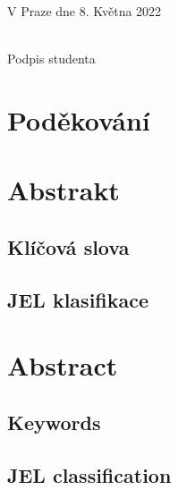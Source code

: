 \vspace{2cm}
\noindent
V Praze dne 8. Května 2022
\hfill%
\begin{minipage}[t]{.5\textwidth}%
\begin{center}
\dotfill\\
Podpis studenta
\end{center}
\end{minipage}
\vspace{1cm}

\openright
\vspace*{\fill}
\section*{Poděkování}
\noindent
\Podekovani
\vspace{1cm}


\openright
\section*{Abstrakt}
\noindent
\Abstrakt
\subsection*{Klíčová slova}
\noindent
\KlicovaSlova
\subsection*{JEL klasifikace}
\noindent
\JEL

\newpage

\bigskip\bigskip\bigskip
\section*{Abstract}
\noindent
\AbstraktEN
\subsection*{Keywords}
\noindent
\KlicovaSlovaEN
\subsection*{JEL classification}
\noindent
\JEL

\openright
